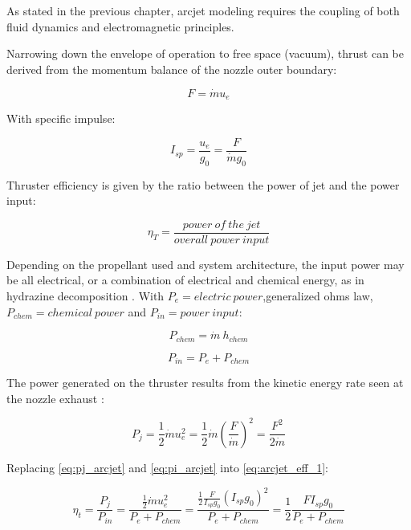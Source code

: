 As stated in the previous chapter, arcjet modeling requires the coupling of both fluid dynamics and electromagnetic principles.

Narrowing down the envelope of operation to free space (vacuum), thrust can be derived from the momentum balance of the nozzle outer boundary:

\begin{equation}
\label{eq:arcjet_thrust}
    F = \dot{m} u_e
\end{equation}

With specific impulse:

\begin{equation}
\label{eq:isp_arcjet}
    I_{sp} = \frac{u_e}{g_0} =\frac{F}{\dot{m} g_0}
\end{equation}

Thruster efficiency is given by the ratio between the power of jet and the power input:

\begin{equation}
\label{eq:arcjet_eff_1}
    \eta_T = \frac{power \ of \ the \ jet}{overall \ power \ input}
\end{equation}

Depending on the propellant used and system architecture, the input power may be all electrical, or a combination of electrical and chemical energy, as in hydrazine decomposition \cite{rpe_book}. With $P_e = electric \ power$,generalized ohms law, $P_{chem} = chemical \ power$ and $P_{in} = power \ input$:

\begin{equation}
\label{eq:pchm_arcjet}
    P_{chem} = \dot{m} \ h_{chem}
\end{equation}

\begin{equation}
\label{eq:pi_arcjet}
    P_{in} = P_e + P_{chem} 
\end{equation}

The power generated on the thruster results from the kinetic energy rate seen at the nozzle exhaust \cite{rpe_book}: 

\begin{equation}
\label{eq:pj_arcjet}
    P_{j} = \frac{1}{2} \dot{m} u_e^2 =  \frac{1}{2} \dot{m} \left( \frac{F}{\dot{m}} \right)^2 = \frac{F^2}{2 \dot{m}}
\end{equation}

Replacing \eqref{eq:pj_arcjet} and \eqref{eq:pi_arcjet} into \eqref{eq:arcjet_eff_1}:

\begin{equation}
\label{eq:arcjet_eff_2}
    \eta_t = \frac{P_j}{P_{in}} = \frac{\frac{1}{2} \dot{m}u_e^2}{P_e + P_{chem}} = \frac{\frac{1}{2} \frac{F}{I_{sp} g_0} \left( I_{sp} g_0 \right)^2}{P_e + P_{chem}} = \frac{1}{2} \frac{F I_{sp} g_0}{{P_e + P_{chem}}}
\end{equation}

